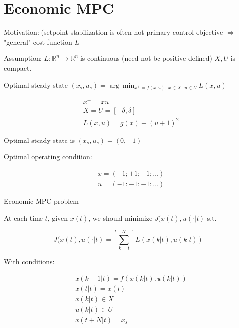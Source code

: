 \section{Economic MPC}

Motivation: (setpoint stabilization is often not primary control objective 
$\Rightarrow$ "general" cost function $L$.

Assumption: $L:\mathbb{R}^n\rightarrow\mathbb{R}^n$ is continuous (need not
be positive defined) $X,U$ is compact.

\begin{Definition}
 Optimal steady-state $(x_s,u_s)=\arg\min_{x^+=f(x,u);\ x\in X;\ u\in U}L(x,u)$
\end{Definition}

\begin{Example}
 \begin{equation*}
  \begin{split}
   &x^+=xu \\
   &X=U=[-\delta,\delta] \\
   &L(x,u)=g(x)+(u+1)^2
  \end{split}
 \end{equation*}

 Optimal steady state is $(x_s,u_s)=(0,-1)$

 Optimal operating condition:

 \begin{equation*}
  \begin{split}
   &x=(-1;+1;-1;\dots) \\
   &u=(-1;-1;-1;\dots)
  \end{split}
 \end{equation*}
\end{Example}


Economic MPC problem

At each time $t$, given $x(t)$, we should minimize $J(x(t),u(\cdot|t)$ s.t.

$$J(x(t),u(\cdot|t) = \sum_{k=t}^{t+N-1}L(x(k|t),u(k|t))$$

With conditions:

\begin{equation*}
 \begin{split}
  &x(k+1|t) = f(x(k|t),u(k|t)) \\
  &x(t|t) = x(t) \\
  &x(k|t)\in X \\
  &u(k|t)\in U \\
  &x(t+N|t) = x_s
 \end{split}
\end{equation*}

